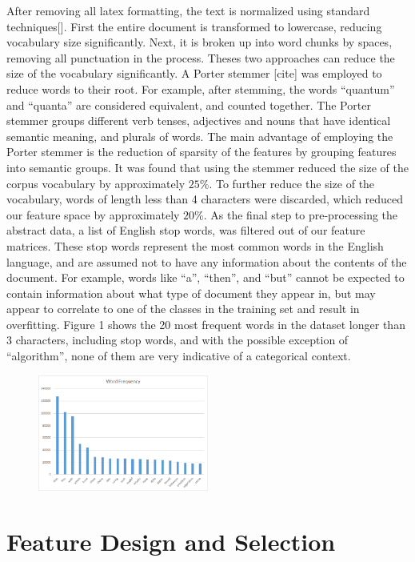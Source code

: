 \documentclass[10pt,twocolumn]{article}
\begin{document}
After removing all latex formatting, the text is normalized using standard techniques[\cite{sproat2001normalization}]. First the entire document is transformed to lowercase, reducing vocabulary size significantly. Next, it is broken up into word chunks by spaces, removing all punctuation in the process. Theses two approaches can reduce the size of the vocabulary significantly. A Porter stemmer [cite] was employed to reduce words to their root.  For example, after stemming, the words ``quantum'' and ``quanta'' are considered equivalent, and counted together. The Porter stemmer groups different verb tenses, adjectives and nouns that have identical semantic meaning, and plurals of words.  The main advantage of employing the Porter stemmer is the reduction of sparsity of the features by grouping features into semantic groups.  It was found that using the stemmer reduced the size of the corpus vocabulary by approximately $25\%$.  To further reduce the size of the vocabulary, words of length less than 4 characters were discarded, which reduced our feature space by approximately $20\%$.  As the final step to pre-processing the abstract data, a list of English stop words, was filtered out of our feature matrices.  These stop words represent the most common words in the English language, and are assumed not to have any information about the contents of the document.  For example, words like ``a'', ``then'', and ``but'' cannot be expected to contain information about what type of document they appear in, but may appear to correlate to one of the classes in the training set and result in overfitting.  Figure 1 shows the 20 most frequent words in the dataset longer than 3 characters, including stop words, and with the possible exception of ``algorithm'', none of them are very indicative of a categorical context.

\begin{figure}
  \centering
  \includegraphics[width=0.5\textwidth]{./word_frequency.png}
  \label{freq}
\end{figure}
\section*{Feature Design and Selection}
\end{document}
